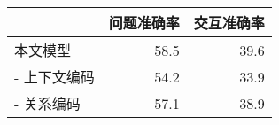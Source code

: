 \begin{tabular}{l|rr}
\hline\hline
            & 问题准确率 & 交互准确率 \\ \hline
本文模型     & 58.5      & 39.6  \\
- 上下文编码 & 54.2      & 33.9  \\
- 关系编码   & 57.1      & 38.9  \\ \hline\hline
\end{tabular}
